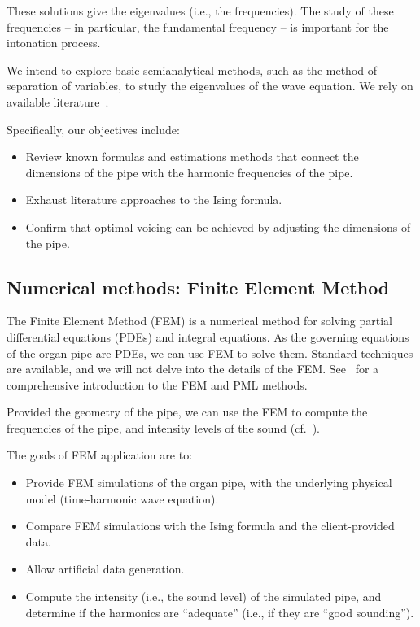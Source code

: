 \documentclass{psu-report}
\begin{document}
These solutions give the eigenvalues (i.e., the frequencies). 
The study of these frequencies -- in particular, the fundamental
frequency -- is important for the intonation process.

We intend to explore basic semianalytical methods, such as the method of
separation of variables, to study the eigenvalues of the wave equation.
We rely on available literature~\autocite{2004RosFle-1, 2012RosFle-1}.

Specifically, our objectives include:
\begin{itemize}
    \item Review known formulas and estimations methods that connect the
        dimensions of the pipe with the harmonic frequencies of the pipe.
    \item Exhaust literature approaches to the Ising formula.
    \item Confirm that optimal voicing can be achieved by adjusting the
        dimensions of the pipe.
\end{itemize}

\subsection{Numerical methods: Finite Element Method}

The Finite Element Method (FEM) is a numerical method for solving partial
differential equations (PDEs) and integral equations.
As the governing equations of the organ pipe are PDEs, we can use FEM to solve
them.
Standard techniques are available, and we will not delve into the details of the
FEM.
See~\autocite{2021ErnGue-1, 2021ErnGue-2, 2019VazKeeDem-1} for a
comprehensive introduction to the FEM and PML methods.

Provided the geometry of the pipe, we can use the FEM to compute the frequencies
of the pipe, and intensity levels of the sound
(cf.~\autocite[Figure 1]{2009RucAugFia-1}).

The goals of FEM application are to:
\begin{itemize}
    \item Provide FEM simulations of the organ pipe, with the underlying
        physical model (time-harmonic wave equation).
    \item Compare FEM simulations with the Ising formula and the client-provided data.
    \item Allow artificial data generation.
    \item Compute the intensity (i.e., the sound level) of the simulated pipe,
        and determine if the harmonics are ``adequate'' (i.e., if they are
        ``good sounding'').
\end{itemize}
\end{document}
